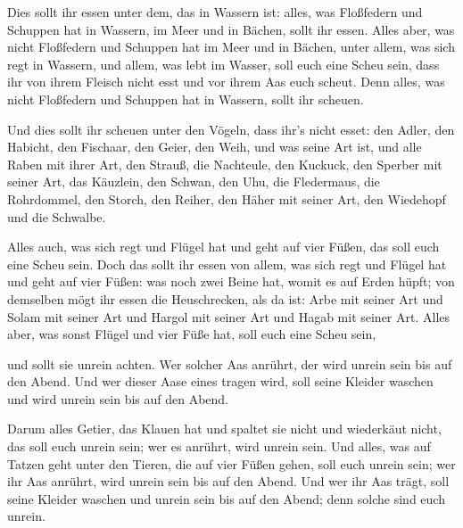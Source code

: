  Dies sollt ihr essen unter dem, das in Wassern ist:
alles, was Floßfedern und Schuppen hat in Wassern, im Meer und in
Bächen, sollt ihr essen.  Alles aber, was nicht
Floßfedern und Schuppen hat im Meer und in Bächen, unter allem, was sich
regt in Wassern, und allem, was lebt im Wasser, soll euch eine Scheu
sein,  dass ihr von ihrem Fleisch nicht esst und vor
ihrem Aas euch scheut.  Denn alles, was nicht Floßfedern
und Schuppen hat in Wassern, sollt ihr scheuen.

 Und dies sollt ihr scheuen unter den Vögeln, dass ihr's
nicht esset: den Adler, den Habicht, den Fischaar,  den
Geier, den Weih, und was seine Art ist,  und alle Raben
mit ihrer Art,  den Strauß, die Nachteule, den Kuckuck,
den Sperber mit seiner Art,  das Käuzlein, den Schwan,
den Uhu,  die Fledermaus, die Rohrdommel, 
den Storch, den Reiher, den Häher mit seiner Art, den Wiedehopf und die
Schwalbe.

 Alles auch, was sich regt und Flügel hat und geht auf
vier Füßen, das soll euch eine Scheu sein.  Doch das
sollt ihr essen von allem, was sich regt und Flügel hat und geht auf
vier Füßen: was noch zwei Beine hat, womit es auf Erden hüpft;
 von demselben mögt ihr essen die Heuschrecken, als da
ist: Arbe mit seiner Art und Solam mit seiner Art und Hargol mit seiner
Art und Hagab mit seiner Art.  Alles aber, was sonst
Flügel und vier Füße hat, soll euch eine Scheu sein,

 und sollt sie unrein achten. Wer solcher Aas anrührt,
der wird unrein sein bis auf den Abend.  Und wer dieser
Aase eines tragen wird, soll seine Kleider waschen und wird unrein sein
bis auf den Abend.

 Darum alles Getier, das Klauen hat und spaltet sie nicht
und wiederkäut nicht, das soll euch unrein sein; wer es anrührt, wird
unrein sein.  Und alles, was auf Tatzen geht unter den
Tieren, die auf vier Füßen gehen, soll euch unrein sein; wer ihr Aas
anrührt, wird unrein sein bis auf den Abend.  Und wer ihr
Aas trägt, soll seine Kleider waschen und unrein sein bis auf den Abend;
denn solche sind euch unrein.

